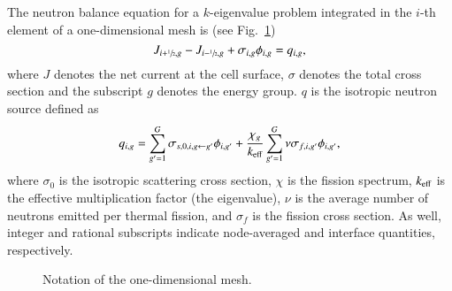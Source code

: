 \documentclass[review,3p,onecolumn,sort&compress]{elsarticle}
\newcommand{\keff}{\ensuremath{k_{\textrm{\scriptsize{eff}}}}}
\newcommand{\hzi}{\ensuremath{\sfrac{1}{2}}}
\begin{document}
The neutron balance equation for a $k$-eigenvalue problem integrated in the $i$-th element of a one-dimensional mesh is (see Fig.~\ref{fig:mesh1D})
\begin{equation}
\label{eq:balance}
J_{i+\hzi ,g} - J_{i-\hzi ,g} + \sigma_{i,g} \phi_{i,g} = q_{i,g},
\end{equation}
where $J$ denotes the net current at the cell surface, $\sigma$ denotes the total cross section and the subscript $g$ denotes the energy group. $q$ is the isotropic neutron source defined as
\begin{equation}
\label{eq:qsrc}
q_{i,g} = \sum\limits_{g'=1}^G\sigma_{s,0,i,g\leftarrow g'}\phi_{i,g'} +
\frac{\chi_g}{\keff}\sum\limits_{g'=1}^G\nu\sigma_{f,i,g'}\phi_{i,g'},
\end{equation}
where $\sigma_0$ is the isotropic scattering cross section, $\chi$ is the fission spectrum, $\keff$ is the effective multiplication factor (the eigenvalue), $\nu$ is the average number of neutrons emitted per thermal fission, and $\sigma_f$ is the fission cross section. As well, integer and rational subscripts indicate node-averaged and interface quantities, respectively.
%
\begin{figure}[htbp]
	\centering
	\caption{Notation of the one-dimensional mesh.}
	\label{fig:mesh1D}
\end{figure}
\end{document}
